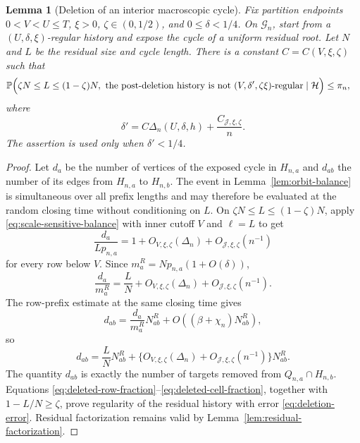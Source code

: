\documentclass[11pt]{article}
\newtheorem{lemma}[theorem]{Lemma}
\theoremstyle{definition}
\theoremstyle{remark}
\newcommand{\Pp}{\mathbb P}
\newcommand{\cH}{\mathcal H}
\newcommand{\cG}{\mathcal G}
\newcommand{\cJ}{\mathcal J}
\begin{document}
\begin{lemma}[Deletion of an interior macroscopic cycle]
\label{lem:deletion-stability}
Fix partition endpoints $0<V<U\le T$, $\xi>0$,
$\zeta\in(0,1/2)$, and $0\le\delta<1/4$.  On $\cG_n$, start from a
$(U,\delta,\xi)$-regular history and expose the cycle of a uniform residual
root.  Let $N$ and $L$ be the residual size and cycle length.  There is a
constant $C=C(V,\xi,\zeta)$ such that
\begin{align}
 &\Pp\Bigl(
 \zeta N\le L\le(1-\zeta)N,\ 
 \text{the post-deletion history is not }
 (V,\delta',\zeta\xi)\text{-regular}
 \mid\cH\Bigr)
 \le\pi_n,
 \label{eq:deletion-joint}
\end{align}
where
\begin{equation}
 \delta'=C\Delta_n(U,\delta,h)+\frac{C_{\cJ,\xi,\zeta}}n.
 \label{eq:deletion-error}
\end{equation}
The assertion is used only when $\delta'<1/4$.
\end{lemma}

\begin{proof}
Let $d_a$ be the number of vertices of the exposed cycle in $H_{n,a}$ and
$d_{ab}$ the number of its edges from $H_{n,a}$ to $H_{n,b}$.  The event in
Lemma~\ref{lem:orbit-balance} is simultaneous over all prefix lengths and may
therefore be evaluated at the random closing time without conditioning on
$L$.  On $\zeta N\le L\le(1-\zeta)N$, apply
\eqref{eq:scale-sensitive-balance} with inner cutoff $V$ and $\ell=L$ to get
\[
 \frac{d_a}{Lp_{n,a}}
 =1+O_{V,\xi,\zeta}(\Delta_n)+O_{\cJ,\xi,\zeta}(n^{-1})
\]
for every row below $V$.  Since
$m_a^R=Np_{n,a}(1+O(\delta))$,
\begin{equation}
 \frac{d_a}{m_a^R}
 =\frac LN+O_{V,\xi,\zeta}(\Delta_n)+O_{\cJ,\xi,\zeta}(n^{-1}).
 \label{eq:deleted-row-fraction}
\end{equation}
The row-prefix estimate at the same closing time gives
\[
 d_{ab}=\frac{d_a}{m_a^R}N_{ab}^R
        +O((\beta+\chi_n)N_{ab}^R),
\]
so
\begin{equation}
 d_{ab}=\frac LN N_{ab}^R
 +\bigl\{O_{V,\xi,\zeta}(\Delta_n)
          +O_{\cJ,\xi,\zeta}(n^{-1})\bigr\}N_{ab}^R.
 \label{eq:deleted-cell-fraction}
\end{equation}
The quantity $d_{ab}$ is exactly the number of targets removed from
$Q_{n,a}\cap H_{n,b}$.  Equations
\eqref{eq:deleted-row-fraction}--\eqref{eq:deleted-cell-fraction}, together
with $1-L/N\ge\zeta$, prove regularity of the residual history with error
\eqref{eq:deletion-error}.  Residual factorization remains valid by
Lemma~\ref{lem:residual-factorization}.
\end{proof}
\end{document}
